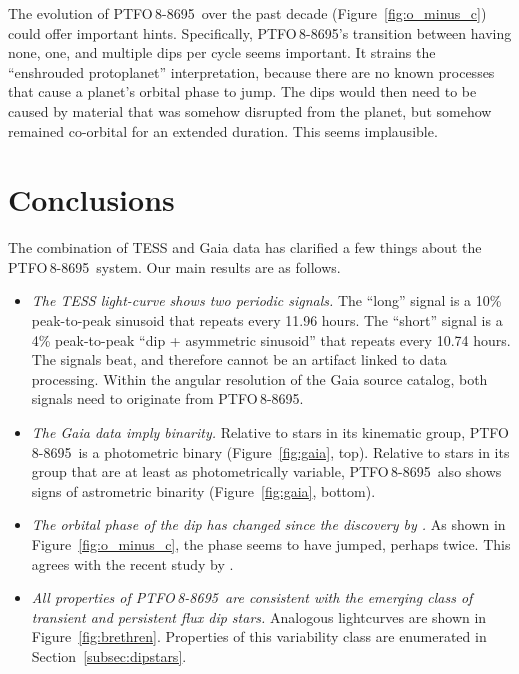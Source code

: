 \documentclass[12pt,twocolumn,tighten]{aastex62}
\newcommand{\ptfo}{PTFO$\,$8-8695}
\begin{document}
The evolution of \ptfo\
over the past decade (Figure~\ref{fig:o_minus_c}) could offer important
hints.  Specifically, \ptfo's transition between having none, one, and
multiple dips per cycle seems important.  It strains the ``enshrouded
protoplanet'' interpretation, because there are no known processes
that cause a planet's orbital phase to jump.  The dips would then need
to be caused by material that was somehow disrupted from the planet,
but somehow remained co-orbital for an extended duration. This seems
implausible.

\section{Conclusions}
\label{sec:conclusions}

The combination of TESS and Gaia data has clarified a few things about
the \ptfo\ system.  Our main results are as follows.
\begin{itemize}
  \item {\it The TESS light-curve shows two periodic signals.} The
    ``long'' signal is a 10\% peak-to-peak sinusoid that repeats every
    11.96 hours.  The ``short'' signal is a 4\% peak-to-peak ``dip +
    asymmetric sinusoid'' that repeats every 10.74 hours. The signals
    beat, and therefore cannot be an artifact linked to data
    processing.
    Within the angular resolution of the Gaia source
    catalog, both signals need to originate from \ptfo.
  \item {\it The Gaia data imply binarity.} Relative to stars in its
    kinematic group, \ptfo\ is a photometric binary
    (Figure~\ref{fig:gaia}, top).  Relative to stars in its group that
    are at least as photometrically variable, \ptfo\ also shows
    signs of astrometric binarity (Figure~\ref{fig:gaia}, bottom).
  \item {\it The orbital phase of the dip has changed since the
    discovery by \citet{van_eyken_ptf_2012}.} As shown in
    Figure~\ref{fig:o_minus_c}, the phase seems to have jumped,
    perhaps twice. This agrees with the recent study by
    \citet{tanimoto_evidence_2020}.
  \item {\it All properties of \ptfo\ are consistent with the emerging
    class of transient and persistent flux dip stars.} Analogous
    lightcurves are shown in Figure~\ref{fig:brethren}.  Properties of
    this variability class are enumerated in
    Section~\ref{subsec:dipstars}.
\end{itemize}
\end{document}
